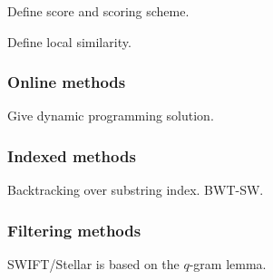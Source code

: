 Define score and scoring scheme.

Define local similarity.

\subsubsection{Online methods}
Give dynamic programming solution.

\subsubsection{Indexed methods}
Backtracking over substring index. BWT-SW.

\subsubsection{Filtering methods}
SWIFT/Stellar is based on the $q$-gram lemma.
